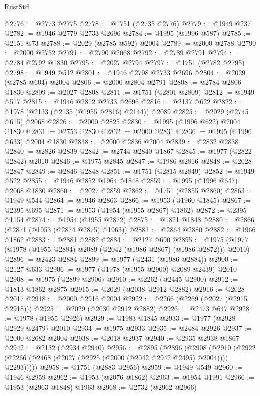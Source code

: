 \begin{lexlean}{RustStd}
\begin{coremodule}
@2776 := @2773 @2775
@2778 := @1751 (@2735 @2776)
@2779 := @1949 @237
@2782 := @1946 @2779 @2733 @2696
@2784 := @1995 (@1996 @587)
@2785 := @2151 @73
@2788 := @2029 (@2785 @592) @2004
@2789 := @2000 @2788
@2790 := @2000 @2752
@2791 := @2790 @2068
@2792 := @2789 @2791
@2794 := @2784 @2792 @1830
@2795 := @2027 @2794
@2797 := @1751 (@2782 @2795)
@2798 := @1949 @512
@2801 := @1946 @2798 @2733 @2696
@2804 := @2029 (@2785 @604) @2004
@2806 := @2000 @2804 @2791
@2808 := @2784 @2806 @1830
@2809 := @2027 @2808
@2811 := @1751 (@2801 @2809)
@2812 := @1949 @517
@2815 := @1946 @2812 @2733 @2696
@2816 := @2137 @622
@2822 := @1978 (@2133 (@2135 (@1955 @2816) @2144)) @2089
@2825 := @2029 (@2745 @615) @2068
@2826 := @2000 @2825
@2830 := @1995 (@1996 @622) @2004 @1830
@2831 := @2753 @2830
@2832 := @2000 @2831
@2836 := @1995 (@1996 @633) @2004 @1830
@2838 := @2000 @2836 @2004
@2839 := @2832 @2838
@2840 := @2826 @2839
@2842 := @2744 @2840 @1867
@2845 := @1977 (@2822 @2842) @2010
@2846 := @1975 @2845
@2847 := @1986 @2816
@2848 := @2028 @2847
@2849 := @2846 @2848
@2851 := @1751 (@2815 @2849)
@2852 := @1949 @522
@2855 := @1946 @2852 @1964 @1848
@2859 := @1995 (@1996 @647) @2068 @1830
@2860 := @2027 @2859
@2862 := @1751 (@2855 @2860)
@2863 := @1949 @544
@2864 := @1946 @2863
@2866 := @1953 (@1960 @1845)
@2867 := @2395 @695
@2871 := @1953 (@1954 (@1955 @2867) @1862)
@2872 := @2395 @1154
@2874 := @1954 (@1955 @2872)
@2875 := @1821 @1848
@2880 := @2866 (@2871 (@1953 (@2874 @2875) @1963))
@2881 := @2864 @2880
@2882 := @1966 @1862
@2883 := @2881 @2882
@2884 := @2127 @690
@2895 := @1975 (@1977 (@1978 (@1955 @2884) @2089 (@2042 (@1986 @2867) (@1986 @2872))) @2010)
@2896 := @2423 @2884
@2899 := @1977 (@2431 (@1986 @2884))
@2900 := @2127 @633
@2906 := @1977 (@1978 (@1955 @2900) @2089 @2439) @2010
@2908 := @1975 (@2899 @2906)
@2910 := @2262 (@2445 @2900)
@2912 := @1813 @1862 @2875
@2915 := @2029 (@2038 @2912 @2882)
@2916 := @2028 @2017
@2918 := @2000 @2916 @2004
@2922 := @2266 (@2269 (@2027 (@2915 @2918)))
@2925 := @2029 (@2030 @2912 @2882)
@2926 := @2473 @647
@2928 := @1978 (@1955 @2926)
@2929 := @1983 @1845
@2933 := @1977 (@2928 @2929 @2479) @2010
@2934 := @1975 @2933
@2935 := @2484 @2926
@2937 := @2000 @2682 @2004
@2938 := @2018 @2937
@2940 := @2935 @2938 @1867
@2942 := @2132 (@2934 @2940)
@2956 := @2895
    (@2896
      (@2908
        (@2910 (@2922 (@2266 (@2468 (@2027 (@2925 (@2000 (@2042 @2942 @2495) @2004)))) @2293)))))
@2958 := @1751 (@2883 @2956)
@2959 := @1949 @549
@2960 := @1946 @2959
@2962 := @1953 (@2076 @1862)
@2963 := @1954 @1991
@2966 := @1953 (@2963 @1848) @1963
@2968 := @2732 (@2962 @2966)

\end{coremodule}
\end{lexlean}
